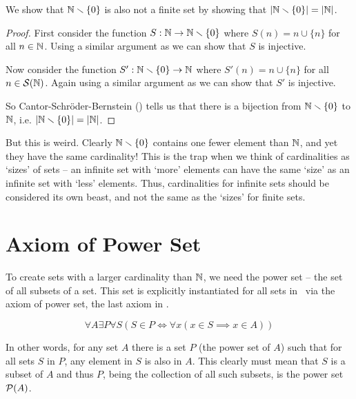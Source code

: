 \begin{example}[$\N \setminus \{0\}$]
    \setlength{\parindent}{1.5em}
    We show that $\N \setminus \{0\}$ is also not a finite set by showing that $|\mathbb{N} \smallsetminus \{0\}| = |\mathbb{N}|$.
    \begin{proof}
        First consider the function $S: \mathbb{N} \to \mathbb{N} \smallsetminus \{0\}$ where $S(n) = n \cup \{n\}$ for all $n \in \mathbb{N}$. Using a similar argument as  we can show that $S$ is injective.

        Now consider the function $S': \mathbb{N} \smallsetminus \{0\} \to \mathbb{N}$ where $S'(n) = n \cup \{n\}$ for all $n \in {\mathcal{S}(\mathbb{N})}$. Again using a similar argument as  we can show that $S'$ is injective.

        So Cantor-Schr\"oder-Bernstein () tells us that there is a bijection from $\N \setminus \{0\}$ to $\mathbb{N}$, i.e. $|\mathbb{N} \smallsetminus \{0\}| = |\mathbb{N}|$.
    \end{proof}
\end{example}

But this is weird. Clearly $\N \setminus \{0\}$ contains one fewer element than $\mathbb{N}$, and yet they have the same cardinality! This is the trap when we think of cardinalities as `sizes' of sets -- an infinite set with `more' elements can have the same `size' as an infinite set with `less' elements. Thus, cardinalities for infinite sets should be considered its own beast, and not the same as the `sizes' for finite sets.

\section{Axiom of Power Set}
To create sets with a larger cardinality than $\mathbb{N}$, we need the power set -- the set of all subsets of a set. This set is explicitly instantiated for all sets in \ZFC~via the axiom of power set, the last axiom in \ZFC.

\begin{axiom}\label{axiom:power-set}
    \[
        \forall A \exists P \forall S (S \in P \iff \forall x (x \in S \implies x \in A))
    \]
\end{axiom}

In other words, for any set $A$ there is a set $P$ (the power set of $A$) such that for all sets $S$ in $P$, any element in $S$ is also in $A$. This clearly must mean that $S$ is a subset of $A$ and thus $P$, being the collection of all such subsets, is the power set ${\mathcal{P}(A)}$.

